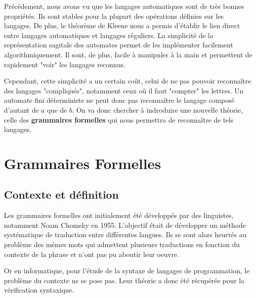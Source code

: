 

\minitoc %



Précédement, nous avons vu que les langages automatiques sont de très bonnes propriétés. Ils sont stables 
pour la plupart des opérations définies sur les langages. De plus, le théorème de Kleene nous a permis d'établir 
le lien direct entre langages automatiques et langages réguliers. 
La simplicité de la représentation sagitale des automates permet de les implémenter facilement algorithmiquement. 
Il sont, de plus, facile à manipuler à la main et permettent de rapidement "voir" les langages reconnus. 

Cependant, cette simplicité a un certain coût, celui de ne pas pouvoir reconnaître des langages "compliqués", notamment
ceux où il faut "compter" les lettres. Un automate fini déterministe ne peut donc pas reconnaître le langage composé 
d'autant de $a$ que de $b$. 
On va donc chercher à indroduire une nouvelle théorie, celle des \textbf{grammaires formelles} qui nous permettra
de reconnaître de tels langages. 



\section{Grammaires Formelles}

\subsection{Contexte et définition}

Les grammaires formelles ont initialement été développés par des linguistes, notamment Noam Chomsky en 1955. 
L'objectif était de développer un méthode systématique de traduction entre différentes langues. 
Ils se sont alors heurtés au problème des mêmes mots qui admettent plusieurs traductions en fonction du contexte de la 
phrase et n'ont pas pu aboutir leur oeuvre. 

\vspace{0.3cm}

Or en informatique, pour l'étude de la syntaxe de langages de programmation, le problème du contexte ne se pose pas. 
Leur théorie a donc été récupérée pour la vérification syntaxique. 

